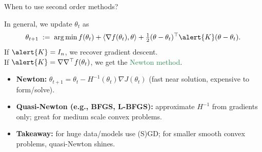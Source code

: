 \documentclass[11pt,aspectratio=169]{beamer}
\begin{document}
\begin{frame}{When to use second order methods?}

In general, we update $\theta_t$ as
$$
\theta_{t+1}\;:=\;\arg\min f(\theta_t)+\<\nabla f(\theta_t),\theta\>+\tfrac12 (\theta-\theta_t)^\top \alert{K} (\theta-\theta_t).
$$
If $\alert{K}=I_n$, we recover gradient descent. \\[2mm]
If $\alert{K}=\nabla\nabla^\top f(\theta_t)$, we get the \textcolor{SeaGreen}{Newton method}. \\[2mm]


\begin{itemize}
\item \textbf{Newton:} \(\theta_{t+1}=\theta_t-H^{-1}(\theta_t)\nabla J(\theta_t)\) (fast near solution, expensive to form/solve).
\item \textbf{Quasi-Newton (e.g., BFGS, L\!-\!BFGS):} approximate \(H^{-1}\) from gradients only; great for medium scale convex problems.
\item \textbf{Takeaway:} for huge data/models use (S)GD; for smaller smooth convex problems, quasi-Newton shines.
\end{itemize}

\end{frame}

\end{document}
